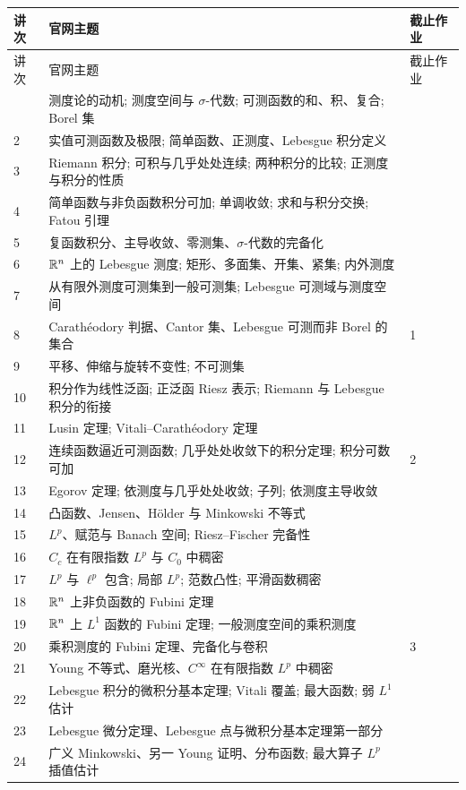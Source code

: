 \begin{longtable}{@{}p{}p{}p{}@{}}
\toprule
讲次 & 官网主题 & 截止作业 \\
\midrule
\endfirsthead
\toprule
讲次 & 官网主题 & 截止作业 \\
\midrule
\endhead
\bottomrule
\endfoot
1 & 测度论的动机; 测度空间与 $\sigma$-代数; 可测函数的和、积、复合; Borel 集 & \\
2 & 实值可测函数及极限; 简单函数、正测度、Lebesgue 积分定义 & \\
3 & Riemann 积分; 可积与几乎处处连续; 两种积分的比较; 正测度与积分的性质 & \\
4 & 简单函数与非负函数积分可加; 单调收敛; 求和与积分交换; Fatou 引理 & \\
5 & 复函数积分、主导收敛、零测集、$\sigma$-代数的完备化 & \\
6 & $\mathbb R^n$ 上的 Lebesgue 测度; 矩形、多面集、开集、紧集; 内外测度 & \\
7 & 从有限外测度可测集到一般可测集; Lebesgue 可测域与测度空间 & \\
8 & Carath\'eodory 判据、Cantor 集、Lebesgue 可测而非 Borel 的集合 & 1 \\
9 & 平移、伸缩与旋转不变性; 不可测集 & \\
10 & 积分作为线性泛函; 正泛函 Riesz 表示; Riemann 与 Lebesgue 积分的衔接 & \\
11 & Lusin 定理; Vitali--Carath\'eodory 定理 & \\
12 & 连续函数逼近可测函数; 几乎处处收敛下的积分定理; 积分可数可加 & 2 \\
13 & Egorov 定理; 依测度与几乎处处收敛; 子列; 依测度主导收敛 & \\
14 & 凸函数、Jensen、H\"older 与 Minkowski 不等式 & \\
15 & $L^p$、赋范与 Banach 空间; Riesz--Fischer 完备性 & \\
16 & $C_c$ 在有限指数 $L^p$ 与 $C_0$ 中稠密 & \\
17 & $L^p$ 与 $\ell^p$ 包含; 局部 $L^p$; 范数凸性; 平滑函数稠密 & \\
18 & $\mathbb R^n$ 上非负函数的 Fubini 定理 & \\
19 & $\mathbb R^n$ 上 $L^1$ 函数的 Fubini 定理; 一般测度空间的乘积测度 & \\
20 & 乘积测度的 Fubini 定理、完备化与卷积 & 3 \\
21 & Young 不等式、磨光核、$C^\infty$ 在有限指数 $L^p$ 中稠密 & \\
22 & Lebesgue 积分的微积分基本定理; Vitali 覆盖; 最大函数; 弱 $L^1$ 估计 & \\
23 & Lebesgue 微分定理、Lebesgue 点与微积分基本定理第一部分 & \\
24 & 广义 Minkowski、另一 Young 证明、分布函数; 最大算子 $L^p$ 插值估计 & \\
\end{longtable}

